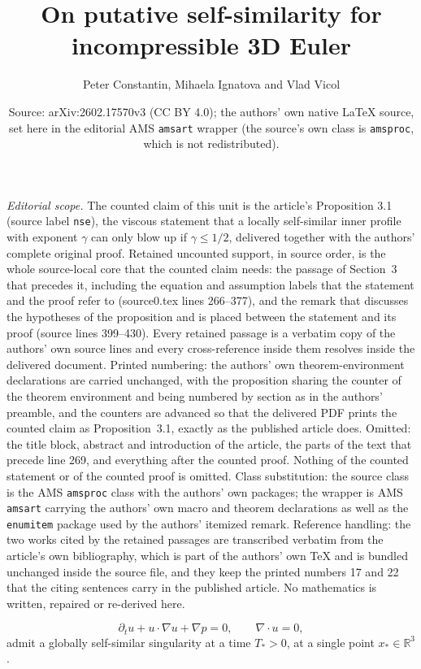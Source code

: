 \documentclass[10pt,a4paper]{amsart}
\title{On putative self-similarity for incompressible 3D Euler}
\author{Peter Constantin, Mihaela Ignatova and Vlad Vicol}
\date{Source: arXiv:2602.17570v3 (CC BY 4.0); the authors' own native \LaTeX{} source, set here in the editorial AMS \texttt{amsart} wrapper (the source's own class is \texttt{amsproc}, which is not redistributed).}
\theoremstyle{plain}
\theoremstyle{remark}
\begin{document}
\maketitle
\noindent\textit{Editorial scope.} The counted claim of this unit is the article's Proposition 3.1 (source label \texttt{nse}), the viscous statement that a locally self-similar inner profile with exponent $\gamma$ can only blow up if $\gamma\leq 1/2$, delivered together with the authors' complete original proof. Retained uncounted support, in source order, is the whole source-local core that the counted claim needs: the passage of Section~3 that precedes it, including the equation and assumption labels that the statement and the proof refer to (source0.tex lines 266--377), and the remark that discusses the hypotheses of the proposition and is placed between the statement and its proof (source lines 399--430). Every retained passage is a verbatim copy of the authors' own source lines and every cross-reference inside them resolves inside the delivered document. Printed numbering: the authors' own theorem-environment declarations are carried unchanged, with the proposition sharing the counter of the theorem environment and being numbered by section as in the authors' preamble, and the counters are advanced so that the delivered PDF prints the counted claim as Proposition~3.1, exactly as the published article does. Omitted: the title block, abstract and introduction of the article, the parts of the text that precede line 269, and everything after the counted proof. Nothing of the counted statement or of the counted proof is omitted. Class substitution: the source class is the AMS \texttt{amsproc} class with the authors' own packages; the wrapper is AMS \texttt{amsart} carrying the authors' own macro and theorem declarations as well as the \texttt{enumitem} package used by the authors' itemized remark. Reference handling: the two works cited by the retained passages are transcribed verbatim from the article's own bibliography, which is part of the authors' own TeX and is bundled unchanged inside the source file, and they keep the printed numbers 17 and 22 that the citing sentences carry in the published article. No mathematics is written, repaired or re-derived here.

\setcounter{section}{3}
\setcounter{theorem}{0}
\begin{equation}
\partial_t u + u \cdot \nabla u+ \nabla p = 0 , \qquad 
\nabla \cdot u =0  , 
\label{eq:Euler:velocity}
\end{equation}
admit a globally self-similar singularity at a time $ T_* > 0$, at a single point $x_* \in \mathbb{R}^3$. 
\end{document}
